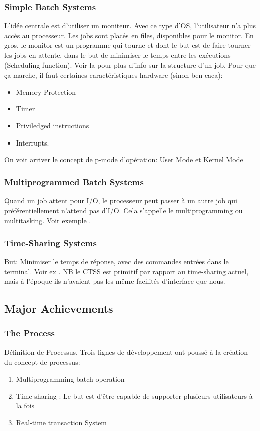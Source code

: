\subsubsection{Simple Batch Systems}
L'idée centrale est d'utiliser un moniteur.
Avec ce type d'OS, l'utilisateur n'a plus accès au processeur.
Les jobs sont placés en files, disponibles pour le monitor.
En gros, le monitor est un programme qui tourne et dont le but est de faire tourner les jobs en attente,
dans le but de minimiser le temps entre les exécutions (Scheduling function).
Voir la \cite[p.~74]{stallings} pour plus d'info sur la structure d'un job.
Pour que ça marche, il faut certaines caractéristiques hardware (sinon ben caca):
\begin{itemize}
  \item Memory Protection
  \item Timer
  \item Priviledged instructions
  \item Interrupts.
\end{itemize}

On voit arriver le concept de p-mode d'opération: User Mode et Kernel Mode


\subsubsection{Multiprogrammed Batch Systems}
Quand un job attent pour I/O, le processeur peut passer à un autre job qui préférentiellement n'attend pas d'I/O.
Cela s'appelle le multiprogramming ou multitasking.
Voir exemple \cite[p.~77]{stallings}.

\subsubsection{Time-Sharing Systems}
But: Minimiser le temps de réponse, avec des commandes entrées dans le terminal.
Voir ex \cite[p.~79]{stallings}.
NB le CTSS est primitif par rapport au time-sharing actuel, mais à l'époque ils n'avaient pas les même facilités d'interface que nous.

\subsection{Major Achievements}

\subsubsection{The Process}
Définition de Processus.
Trois lignes de développement ont poussé à la création du concept de processus:
\begin{enumerate}
  \item Multiprogramming batch operation
  \item Time-sharing : Le but est d'être capable de supporter plusieurs utilisateurs à la fois
  \item Real-time transaction System
\end{enumerate}

